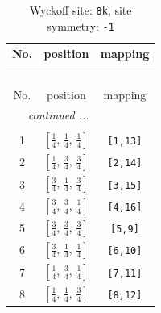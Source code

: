 \documentclass[fleqn,8pt]{jsarticle}
\begin{document}
\renewcommand{\arraystretch}{1.2}
\begin{longtable}{ccc}
\caption{Wyckoff site: {\tt 8k}, site symmetry: {\tt -1}}
 \\
 \hline \hline
No. & position & mapping \\ \hline \endfirsthead

\multicolumn{2}{l}{\tablename\ \thetable{}} \\
 \hline \hline
No. & position & mapping \\ \hline \endhead

 \hline \hline
\multicolumn{2}{r}{\footnotesize\it continued ...} \\ \endfoot

 \hline \hline
\multicolumn{2}{r}{} \\ \endlastfoot

1 & $\left[ \frac{1}{4},\, \frac{1}{4},\, \frac{1}{4} \right]$ & {\tt [1,13]} \\ \hline
2 & $\left[ \frac{1}{4},\, \frac{3}{4},\, \frac{3}{4} \right]$ & {\tt [2,14]} \\ \hline
3 & $\left[ \frac{3}{4},\, \frac{1}{4},\, \frac{3}{4} \right]$ & {\tt [3,15]} \\ \hline
4 & $\left[ \frac{3}{4},\, \frac{3}{4},\, \frac{1}{4} \right]$ & {\tt [4,16]} \\ \hline
5 & $\left[ \frac{3}{4},\, \frac{3}{4},\, \frac{3}{4} \right]$ & {\tt [5,9]} \\ \hline
6 & $\left[ \frac{3}{4},\, \frac{1}{4},\, \frac{1}{4} \right]$ & {\tt [6,10]} \\ \hline
7 & $\left[ \frac{1}{4},\, \frac{3}{4},\, \frac{1}{4} \right]$ & {\tt [7,11]} \\ \hline
8 & $\left[ \frac{1}{4},\, \frac{1}{4},\, \frac{3}{4} \right]$ & {\tt [8,12]} \\
\end{longtable}
\renewcommand{\arraystretch}{1.2}
\end{document}
